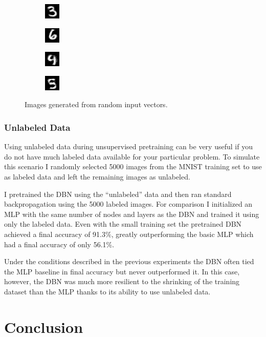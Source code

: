 \documentclass{article}
\begin{document}
	\begin{figure}[h]
		\centering
		\begin{subfigure}[b]{0.2\textwidth}
			\centering
			\includegraphics[scale=2.0]{images/rand_gen1}
		\end{subfigure}
		\begin{subfigure}[b]{0.2\textwidth}
			\centering
			\includegraphics[scale=2.0]{images/rand_gen2}
		\end{subfigure}		
		\begin{subfigure}[b]{0.2\textwidth}
			\centering
			\includegraphics[scale=2.0]{images/rand_gen3}
		\end{subfigure}
		\begin{subfigure}[b]{0.2\textwidth}
			\centering
			\includegraphics[scale=2.0]{images/rand_gen5}
		\end{subfigure}
		
		\caption{Images generated from random input vectors.}
		\label{fig:random_generated}
	\end{figure} 

	\subsubsection{Unlabeled Data}
	Using unlabeled data during unsupervised pretraining can be very useful if you do not have much labeled data available for your particular problem. To simulate this scenario I randomly selected 5000 images from the MNIST training set to use as labeled data and left the remaining images as unlabeled. 
	
	I pretrained the DBN using the ``unlabeled'' data and then ran standard backpropagation using the 5000 labeled images. For comparison I initialized an MLP with the same number of nodes and layers as the DBN and trained it using only the labeled data. Even with the small training set the pretrained DBN achieved a final accuracy of 91.3\%, greatly outperforming the basic MLP which had a final accuracy of only 56.1\%.  
	
	Under the conditions described in the previous experiments the DBN  often tied the MLP baseline in final accuracy but never outperformed it. In this case, however, the DBN was much more resilient to the shrinking of the training dataset than the MLP thanks to its ability to use unlabeled data.
	
	\section{Conclusion}
	
	
	
\end{document}

